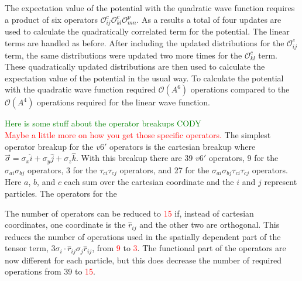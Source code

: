 \documentclass[aps,prc,twocolumn,superscriptaddress,showpacs,floatfix,nofootinbib]{revtex4-1}
\newcommand{\red}[1]{\protect\textcolor{red}{#1}}
\newcommand{\green}[1]{\protect\textcolor{green}{#1}}
\begin{document}
The expectation value of the potential with the quadratic wave function requires a product of six operators $\mathcal{O}^c_{ij}\mathcal{O}^c_{kl}\mathcal{O}^p_{mn}$. As a results a total of four updates are used to calculate the quadratically correlated term for the potential. The linear terms are handled as before. After including the updated distributions for the $\mathcal{O}^c_{ij}$ term, the same distributions were updated two more times for the $\mathcal{O}^c_{kl}$ term. These quadratically updated distributions are then used to calculate the expectation value of the potential in the usual way. To calculate the potential with the quadratic wave function required $\mathcal{O}(A^6)$ operations compared to the $\mathcal{O}(A^4)$ operations required for the linear wave function.

\green{Here is some stuff about the operator breakups CODY \\}
\red{Maybe a little more on how you get those specific operators.} The simplest operator breakup for the $v6'$ operators is the cartesian breakup where $\vec{\sigma} = \sigma_x\hat{i} + \sigma_y\hat{j} + \sigma_z\hat{k}$. With this breakup there are 39 $v6'$ operators, 9 for the $\sigma_{ai}\sigma_{bj}$ operators, 3 for the $\tau_{ci}\tau_{cj}$ operators, and 27 for the $\sigma_{ai}\sigma_{bj}\tau_{ci}\tau_{cj}$ operators. Here $a$, $b$, and $c$ each sum over the cartesian coordinate and the $i$ and $j$ represent particles. The operators for the 




The number of operators can be reduced to \red{15} if, instead of cartesian coordinates, one coordinate is the $\hat{r}_{ij}$ and the other two are orthogonal. This reduces the number of operations used in the spatially dependent part of the tensor term, $3\sigma_i\cdot\hat{r}_{ij}\sigma_j\hat{r}_{ij}$, from \red{9} to \red{3}. The functional part of the operators are now different for each particle, but this does decrease the number of required operations from 39 to \red{15}.



\end{document}
